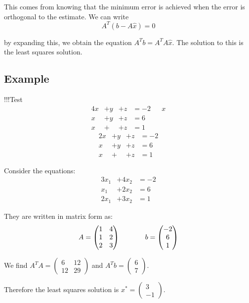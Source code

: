 \documentclass[12pt]{article}
\begin{document}
\begin{itemize}
This comes from knowing that the minimum error is achieved when the error is orthogonal to the estimate.  We can write
\begin{equation*}
A^T (b - A\hat{x}) = 0
\end{equation*}

by expanding this, we obtain the equation $A^T b = A^T A \hat{x}$.  The solution to this is the least squares solution.


\subsection{Example}
!!!Test
\begin{alignat*}{4}
x &+ y &+ z &= -2 && x \\
x &+ y &+ z &= 6 \\
x &+ &+ z &= 1 
\end{alignat*}
\begin{alignat*}{2}
x &+ y &+ z &= -2 \\
x &+ y &+ z &= 6 \\
x &+ &+ z &= 1 
\end{alignat*}

Consider the equations:
\begin{alignat*}{3}
x_1 &+ 4x_2 &= -2 \\
x_1 &+ 2x_2 &= 6 \\
2x_1 &+ 3x_2 &= 1 
\end{alignat*}

They are written in matrix form as:
\begin{equation*}
A = \begin{pmatrix} 1 & 4 \\ 1 & 2 \\ 2 & 3 \end{pmatrix} \hspace{.5in}
b = \begin{pmatrix} -2 \\ 6 \\ 1 \end{pmatrix}
\end{equation*}

We find $A^T A = \begin{pmatrix} 6 & 12 \\ 12 & 29 \end{pmatrix}$ and $A^T b = \begin{pmatrix} 6 \\7 \end{pmatrix}$.

Therefore the least squares solution is $x^* = \begin{pmatrix} 3 \\ -1 \end{pmatrix}$.


\end{itemize}
\end{document}
